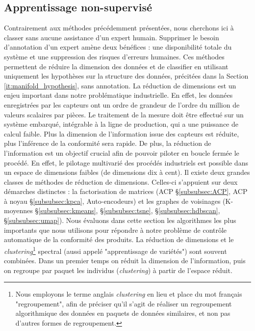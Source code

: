\subsection{Apprentissage non-supervisé} \label{subsec:unsupervised}
Contrairement aux méthodes précédemment présentées, nous cherchons ici à classer sans aucune assistance d'un expert humain.
Supprimer le besoin d'annotation d'un expert amène deux bénéfices : une disponibilité totale du système et une suppression des risques d'erreurs humaines.
Ces méthodes permettent de réduire la dimension des données et de classifier en utilisant uniquement les hypothèses sur la structure des données, précitées dans la Section \ref{it:manifold_hypothesis}, sans annotation.
La réduction de dimensions est un enjeu important dans notre problématique industrielle.
En effet, les données enregistrées par les capteurs ont un ordre de grandeur de l'ordre du million de valeurs scalaires par pièces.
Le traitement de la mesure doit être effectué sur un système embarqué, intégrable à la ligne de production, qui a une puissance de calcul faible.
Plus la dimension de l'information issue des capteurs est réduite, plus l'inférence de la conformité sera rapide.
De plus, la réduction de l'information est un objectif crucial afin de pouvoir piloter en boucle fermée le procédé.
En effet, le pilotage multivarié des procédés industriels est possible dans un espace de dimensions faibles (de dimensions dix à cent).
Il existe deux grandes classes de méthodes de réduction de dimensions.
Celles-ci s'appuient sur deux démarches distinctes : la factorisation de matrices (ACP §\ref{subsubsec:ACP}, ACP à noyau §\ref{subsubsec:kpca}, Auto-encodeurs) et les graphes de voisinages (K-moyennes §\ref{subsubsec:kmeans}, §\ref{subsubsec:tsne}, §\ref{subsubsec:hdbscan}, §\ref{subsubsec:umap}).
Nous évaluons dans cette section les algorithmes les plus importants que nous utilisons pour répondre à notre problème de contrôle automatique de la conformité des produits.
La réduction de dimensions et le \textit{clustering}\footnote{Nous employons le terme anglais \textit{clustering} en lieu et place du mot français "regroupement", afin de préciser qu'il s'agit de réaliser un regroupement algorithmique des données en paquets de données similaires, et non pas d'autres formes de regroupement.} spectral (aussi appelé "apprentissage de variétés") sont souvent combinées.
Dans un premier temps on réduit la dimension de l'information, puis on regroupe par paquet les individus (\textit{clustering}) à partir de l'espace réduit.

